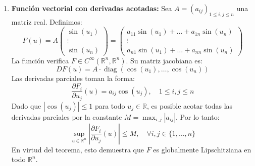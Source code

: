 {\begin{enumerate}
        \item \textbf{Función vectorial con derivadas acotadas:}
        Sea $A = (a_{ij})_{1 \leq i,j \leq n}$ una matriz real. Definimos:
        \[
            F(u) = A \begin{pmatrix} \sin(u_1) \\ \vdots \\ \sin(u_n) \end{pmatrix}
            =
            \begin{pmatrix}
                a_{11} \sin(u_1) + \ldots + a_{1n} \sin(u_n) \\
                \vdots \\
                a_{n1} \sin(u_1) + \ldots + a_{nn} \sin(u_n)
            \end{pmatrix}
        \]
        La función verifica $F \in C^\infty(\mathbb{R}^n, \mathbb{R}^n)$. Su matriz jacobiana es:
        \[
            DF(u) = A \cdot \operatorname{diag}(\cos(u_1), \ldots, \cos(u_n))
        \]
        Las derivadas parciales toman la forma:
        \[
            \frac{\partial F_i}{\partial u_j}(u) = a_{ij} \cos(u_j), \quad 1 \leq i,j \leq n
        \]
        Dado que $|\cos(u_j)| \leq 1$ para todo $u_j \in \mathbb{R}$, es posible acotar todas las derivadas parciales por la constante $M = \max_{i,j} |a_{ij}|$. Por lo tanto:
        \[
            \sup_{u \in \mathbb{R}^n} \left| \frac{\partial F_i}{\partial u_j}(u) \right| \leq M, \quad \forall i, j \in \{ 1, \ldots, n \}
        \]
        En virtud del teorema, esto demuestra que $F$ es globalmente Lipschitziana en todo $\mathbb{R}^n$.


\end{enumerate}}
